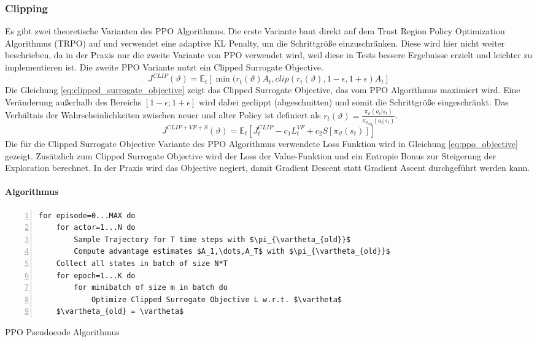 \subsubsection{Clipping}
Es gibt zwei theoretische Varianten des PPO Algorithmus. Die erste Variante baut direkt auf dem Trust Region Policy Optimization Algorithmus (TRPO) \cite{trpoPaper} auf und verwendet eine adaptive KL Penalty, um die Schrittgröße einzuschränken. Diese wird hier nicht weiter beschrieben, da in der Praxis nur die zweite Variante von PPO verwendet wird, weil diese in Tests bessere Ergebnisse erzielt und leichter zu implementieren ist.
Die zweite PPO Variante nutzt ein Clipped Surrogate Objective.
\begin{equation}
    J^{CLIP}(\vartheta) = \mathbb{E}_t\left[ \min(r_t(\vartheta)A_t,clip(r_t(\vartheta),1-\epsilon,1+\epsilon)A_t \right]
    \label{eq:clipped_surrogate_objective}
\end{equation}
Die Gleichung \ref{eq:clipped_surrogate_objective} zeigt das Clipped Surrogate Objective, das vom PPO Algorithmus maximiert wird. Eine Veränderung außerhalb des Bereichs $[1-\epsilon; 1+\epsilon]$ wird dabei geclippt (abgeschnitten) und somit die Schrittgröße eingeschränkt. Das Verhältnis der Wahrscheinlichkeiten zwischen neuer und alter Policy ist definiert als $r_t(\vartheta)=\frac{\pi_\vartheta(a_t\vert s_t)}{\pi_{\vartheta_{old}}(a_t\vert s_t)}$.
\begin{equation}
    J^{CLIP+VF+S}(\vartheta) = \mathbb{E}_t \left[ J_t^{CLIP} - c_1L_t^{VF} + c_2S[\pi_\vartheta(s_t)] \right]
    \label{eq:ppo_objective}
\end{equation}
Die für die Clipped Surrogate Objective Variante des PPO Algorithmus verwendete Loss Funktion wird in Gleichung \ref{eq:ppo_objective} gezeigt. Zusätzlich zum Clipped Surrogate Objective wird der Loss der Value-Funktion und ein Entropie Bonus zur Steigerung der Exploration berechnet. In der Praxis wird das Objective negiert, damit Gradient Descent statt Gradient Ascent durchgeführt werden kann. \cite{PPOPaper}

\paragraph{Algorithmus}

\begin{algorithm}
\begin{lstlisting}[mathescape=true, numbers=left, basicstyle=\normalsize]
for episode=0...MAX do
    for actor=1...N do
        Sample Trajectory for T time steps with $\pi_{\vartheta_{old}}$
        Compute advantage estimates $A_1,\dots,A_T$ with $\pi_{\vartheta_{old}}$
    Collect all states in batch of size N*T
    for epoch=1...K do
        for minibatch of size m in batch do
            Optimize Clipped Surrogate Objective L w.r.t. $\vartheta$
    $\vartheta_{old} = \vartheta$
\end{lstlisting}
\caption{PPO Pseudocode Algorithmus \cite{FoundationsDeepRL}}
\label{alg:ppo}
\end{algorithm}

